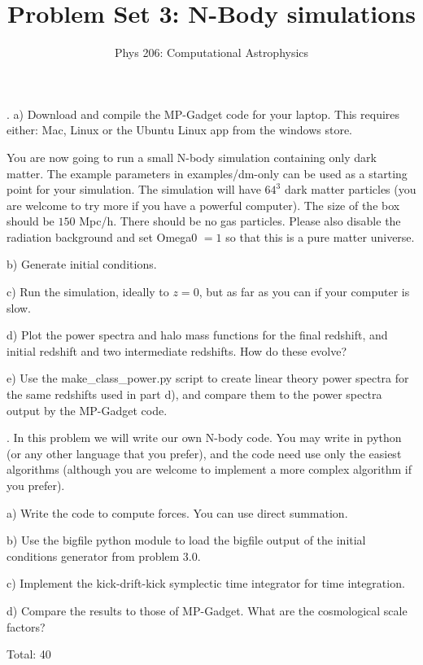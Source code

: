 \documentclass[10pt]{article}
\newenvironment{problem}[2][Problem]{\begin{trivlist}
\item[\hskip \labelsep {\bfseries #1}\hskip \labelsep {\bfseries #2}]}{\end{trivlist}}
\begin{document}
\title{Problem Set 3: N-Body simulations}
\author{Phys 206: Computational Astrophysics}
\maketitle

\begin{problem}{3.0 Run an MP-Gadget Simulation (20)}.
a) Download and compile the MP-Gadget code for your laptop. This requires either: Mac, Linux or the Ubuntu Linux app from the windows store.

You are now going to run a small N-body simulation containing only dark matter. The example parameters in examples/dm-only can be used as a starting point for your simulation. The simulation will have $64^3$ dark matter particles (you are welcome to try more if you have a powerful computer). The size of the box should be $150$ Mpc/h. There should be no gas particles. Please also disable the radiation background and set Omega0 $= 1$ so that this is a pure matter universe.

b) Generate initial conditions.

c) Run the simulation, ideally to $z=0$, but as far as you can if your computer is slow.

d) Plot the power spectra and halo mass functions for the final redshift, and initial redshift and two intermediate redshifts. How do these evolve?

e) Use the make\_class\_power.py script to create linear theory power spectra for the same redshifts used in part d), and compare them to the power spectra output by the MP-Gadget code.
\end{problem}

\begin{problem}{3.1 Write your own N-body code (20)}.
In this problem we will write our own N-body code. You may write in python (or any other language that you prefer), and the code need use only the easiest algorithms (although you are welcome to implement a more complex algorithm if you prefer).

a) Write the code to compute forces. You can use direct summation.

b) Use the bigfile python module to load the bigfile output of the initial conditions generator from problem 3.0.

c) Implement the kick-drift-kick symplectic time integrator for time integration.

d) Compare the results to those of MP-Gadget. What are the cosmological scale factors?
\end{problem}


Total: 40
\end{document}
